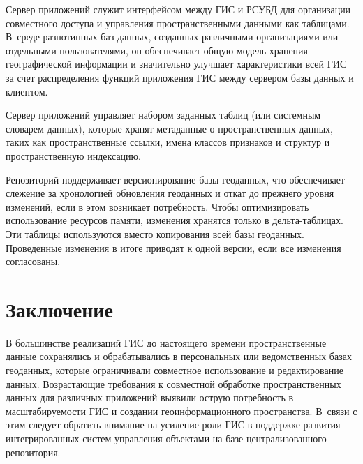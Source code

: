 \begin{multicols}{2}
     Сервер приложений служит интерфейсом между ГИС и РСУБД для организации 
совместного доступа и управления пространственными данными как таблицами. 
В~среде разнотипных баз данных, созданных различными
организациями или отдельными пользователями, он обеспечивает общую 
модель хранения географической информации и значительно улучшает характеристики 
всей ГИС за счет распределения функций приложения ГИС между сервером базы 
данных и клиентом.


      Сервер приложений управляет набором заданных таблиц (или системным словарем 
данных), которые хранят метаданные о пространственных данных, таких как 
пространственные ссылки, имена классов признаков и структур и пространственную 
индексацию. 
      
      Репозиторий поддерживает версионирование базы геоданных, что обеспечивает 
слежение за хронологией обновления геоданных и откат до прежнего уровня изменений, 
если в этом возникает потребность. Чтобы оптимизировать использование ресурсов 
памяти, изменения хранятся только в дель\-та-таб\-ли\-цах. Эти таблицы используются вмес\-то 
копирования всей базы геоданных. Проведенные изменения в итоге приводят к одной 
версии, если все изменения согласованы. 

\section{Заключение}

      В большинстве реализаций ГИС до настоящего времени пространственные данные 
сохранялись и обрабатывались в персональных или ведомственных базах геоданных, 
которые ограничивали совместное использование и редактирование данных. 
Возрастающие требования к совместной обработке пространственных данных для 
различных приложений выявили острую потребность в масштабируемости ГИС и 
создании геоинформационного пространства. В~связи с этим следует обратить внимание 
на усиление роли ГИС в поддержке развития интегрированных систем управления 
объектами на базе централизованного репозитория.
      

\end{multicols}
